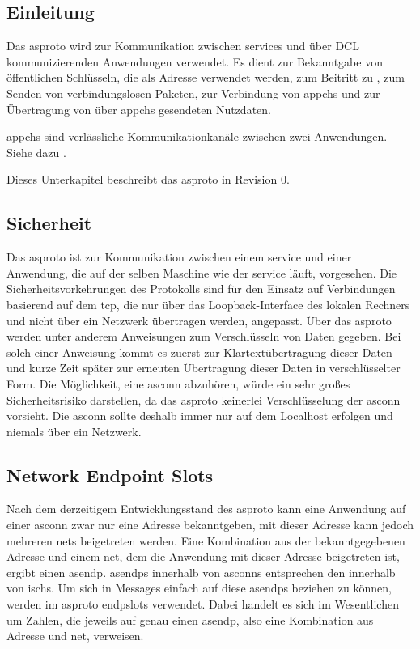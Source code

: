 
\subsection{Einleitung}
Das \gls{asproto} wird zur Kommunikation zwischen \glspl{service} und über DCL
kommunizierenden Anwendungen verwendet. Es dient zur Bekanntgabe von
öffentlichen Schlüsseln, die als Adresse verwendet werden, zum Beitritt zu
, zum Senden von verbindungslosen Paketen, zur
Verbindung von \glspl{appch} und zur Übertragung von über \glspl{appch}
gesendeten Nutzdaten.

\Glspl{appch} sind verlässliche Kommunikationkanäle zwischen zwei Anwendungen.
Siehe dazu .

Dieses Unterkapitel beschreibt das \gls{asproto} in Revision 0.

\subsection{Sicherheit}
Das \gls{asproto} ist zur Kommunikation zwischen einem \gls{service} und einer
Anwendung, die auf der selben Maschine wie der \gls{service} läuft, vorgesehen.
Die Sicherheitsvorkehrungen des Protokolls sind für den Einsatz auf
Verbindungen basierend auf dem \acrfull{tcp}, die nur über das
Loopback-Interface des lokalen Rechners und nicht über ein Netzwerk übertragen
werden, angepasst.
Über das \gls{asproto} werden unter anderem Anweisungen zum Verschlüsseln von
Daten gegeben.
Bei solch einer Anweisung kommt es zuerst zur Klartextübertragung dieser Daten
und kurze Zeit später zur erneuten Übertragung dieser Daten in verschlüsselter
Form.
Die Möglichkeit, eine \gls{asconn} abzuhören, würde ein sehr großes
Sicherheitsrisiko darstellen, da das \gls{asproto} keinerlei Verschlüsselung
der \gls{asconn} vorsieht.
Die \gls{asconn} sollte deshalb immer nur auf dem Localhost erfolgen und niemals
über ein Netzwerk.

\subsection{Network Endpoint Slots}
Nach dem derzeitigem Entwicklungsstand des \gls{asproto} kann eine Anwendung
auf einer \gls{asconn} zwar nur eine Adresse bekanntgeben, mit dieser Adresse
kann jedoch mehreren \glspl{net} beigetreten werden.
Eine Kombination aus der bekanntgegebenen Adresse und einem \gls{net}, dem die
Anwendung mit dieser Adresse beigetreten ist, ergibt einen \gls{asendp}.
\glspl{asendp} innerhalb von \glspl{asconn} entsprechen den
 innerhalb von \glspl{isch}.
Um sich in Messages einfach auf diese \glspl{asendp} beziehen zu können, werden
im \gls{asproto} \glspl{endpslot} verwendet. Dabei handelt es sich im
Wesentlichen um Zahlen, die jeweils auf genau einen \gls{asendp}, also eine
Kombination aus Adresse und \gls{net}, verweisen.

